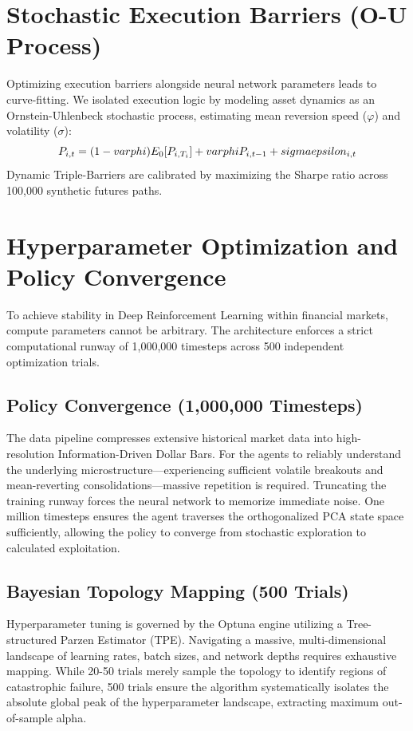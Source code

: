 \documentclass[12pt, a4paper]{article}
\begin{document}
\section{Stochastic Execution Barriers (O-U Process)}
Optimizing execution barriers alongside neural network parameters leads to curve-fitting. We isolated execution logic by modeling asset dynamics as an Ornstein-Uhlenbeck stochastic process, estimating mean reversion speed ($\varphi$) and volatility ($\sigma$):
$$ P_{i,t} = (1 - \\varphi)E_0[P_{i,T_i}] + \\varphi P_{i,t-1} + \\sigma \\epsilon_{i,t} $$
Dynamic Triple-Barriers are calibrated by maximizing the Sharpe ratio across 100,000 synthetic futures paths.

\section{Hyperparameter Optimization and Policy Convergence}
To achieve stability in Deep Reinforcement Learning within financial markets, compute parameters cannot be arbitrary. The architecture enforces a strict computational runway of 1,000,000 timesteps across 500 independent optimization trials.

\subsection{Policy Convergence (1,000,000 Timesteps)}
The data pipeline compresses extensive historical market data into high-resolution Information-Driven Dollar Bars. For the agents to reliably understand the underlying microstructure—experiencing sufficient volatile breakouts and mean-reverting consolidations—massive repetition is required. Truncating the training runway forces the neural network to memorize immediate noise. One million timesteps ensures the agent traverses the orthogonalized PCA state space sufficiently, allowing the policy to converge from stochastic exploration to calculated exploitation.

\subsection{Bayesian Topology Mapping (500 Trials)}
Hyperparameter tuning is governed by the Optuna engine utilizing a Tree-structured Parzen Estimator (TPE). Navigating a massive, multi-dimensional landscape of learning rates, batch sizes, and network depths requires exhaustive mapping. While 20-50 trials merely sample the topology to identify regions of catastrophic failure, 500 trials ensure the algorithm systematically isolates the absolute global peak of the hyperparameter landscape, extracting maximum out-of-sample alpha.
\end{document}
